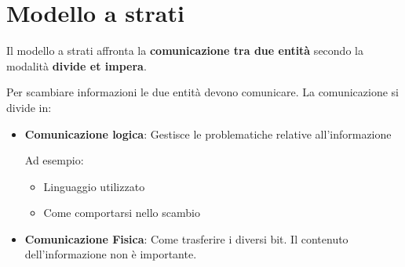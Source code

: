 \documentclass[a4paper]{article}
\begin{document}
\section{Modello a strati}
Il modello a strati affronta la \textbf{comunicazione tra due entità} secondo la modalità
\textbf{divide et impera}.
\begin{figure}[H]
  \centering
\end{figure}
Per scambiare informazioni le due entità devono comunicare. La comunicazione si divide in:
\begin{itemize}
  \item \textbf{Comunicazione logica}: Gestisce le problematiche relative all'informazione

    \noindent Ad esempio:
    \begin{itemize}
      \item Linguaggio utilizzato
      \item Come comportarsi nello scambio
    \end{itemize}

  \item \textbf{Comunicazione Fisica}: Come trasferire i diversi bit. Il contenuto
    dell'informazione non è importante.
\end{itemize}
\end{document}
